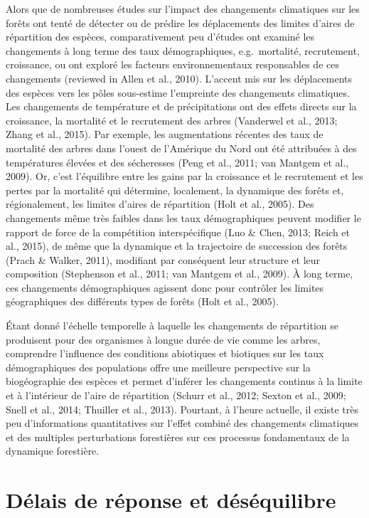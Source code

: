 \documentclass[
]{article}
\begin{document}
Alors que de nombreuses études sur l'impact des changements climatiques
sur les forêts ont tenté de détecter ou de prédire les déplacements des
limites d'aires de répartition des espèces, comparativement peu d'études
ont examiné les changements à long terme des taux démographiques,
e.g.~mortalité, recrutement, croissance, ou ont exploré les facteurs
environnementaux responsables de ces changements (reviewed in Allen et
al., 2010). L'accent mis sur les déplacements des espèces vers les pôles
sous-estime l'empreinte des changements climatiques. Les changements de
température et de précipitations ont des effets directs sur la
croissance, la mortalité et le recrutement des arbres (Vanderwel et al.,
2013; Zhang et al., 2015). Par exemple, les augmentations récentes des
taux de mortalité des arbres dans l'ouest de l'Amérique du Nord ont été
attribuées à des températures élevées et des sécheresses (Peng et al.,
2011; van Mantgem et al., 2009). Or, c'est l'équilibre entre les gains
par la croissance et le recrutement et les pertes par la mortalité qui
détermine, localement, la dynamique des forêts et, régionalement, les
limites d'aires de répartition (Holt et al., 2005). Des changements même
très faibles dans les taux démographiques peuvent modifier le rapport de
force de la compétition interspécifique (Luo \& Chen, 2013; Reich et
al., 2015), de même que la dynamique et la trajectoire de succession des
forêts (Prach \& Walker, 2011), modifiant par conséquent leur structure
et leur composition (Stephenson et al., 2011; van Mantgem et al., 2009).
À long terme, ces changements démographiques agissent donc pour
contrôler les limites géographiques des différents types de forêts (Holt
et al., 2005).

Étant donné l'échelle temporelle à laquelle les changements de
répartition se produisent pour des organismes à longue durée de vie
comme les arbres, comprendre l'influence des conditions abiotiques et
biotiques sur les taux démographiques des populations offre une
meilleure perspective sur la biogéographie des espèces et permet
d'inférer les changements continus à la limite et à l'intérieur de
l'aire de répartition (Schurr et al., 2012; Sexton et al., 2009; Snell
et al., 2014; Thuiller et al., 2013). Pourtant, à l'heure actuelle, il
existe très peu d'informations quantitatives sur l'effet combiné des
changements climatiques et des multiples perturbations forestières sur
ces processus fondamentaux de la dynamique forestière.

\hypertarget{duxe9lais-de-ruxe9ponse-et-duxe9suxe9quilibre}{%
\section{Délais de réponse et
déséquilibre}\label{duxe9lais-de-ruxe9ponse-et-duxe9suxe9quilibre}}
\end{document}
